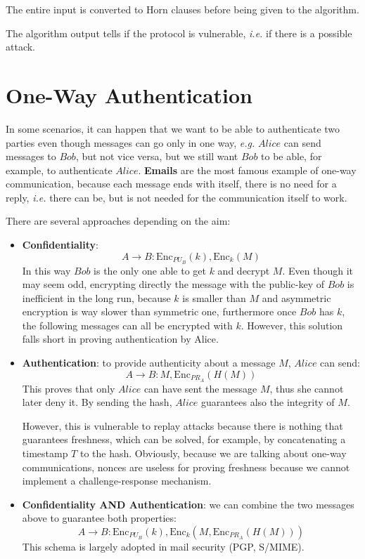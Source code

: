 \documentclass[oneside]{academica}
\begin{document}
The entire input is converted to Horn clauses before being given to the algorithm.

The algorithm output tells if the protocol is vulnerable, \textit{i.e.} if there is a possible attack.

\section{One-Way Authentication}

In some scenarios, it can happen that we want to be able to authenticate two parties even though messages can go only in one way, \textit{e.g.} $Alice$ can send messages to $Bob$, but not vice versa, but we still want $Bob$ to be able, for example, to authenticate $Alice$.
\textbf{Emails} are the most famous example of one-way communication, because each message ends with itself, there is no need for a reply, \textit{i.e.} there can be, but is not needed for the communication itself to work.


\newpage

There are several approaches depending on the aim:
\begin{itemize}
  \item \textbf{Confidentiality}:
    \begin{equation*}
      A \rightarrow B: \text{Enc}_{PU_B}(k), \text{Enc}_k(M)
    \end{equation*}
    In this way $Bob$ is the only one able to get $k$ and decrypt $M$.
    Even though it may seem odd, encrypting directly the message with the public-key of $Bob$ is inefficient in the long run, because $k$ is smaller than $M$ and asymmetric encryption is way slower than symmetric one, furthermore once $Bob$ has $k$, the following messages can all be encrypted with $k$.
    However, this solution falls short in proving authentication by Alice.
  \item \textbf{Authentication}: to provide authenticity about a message $M$, $Alice$ can send:
    \begin{equation*}
      A \rightarrow B: M, \text{Enc}_{PR_A}(H(M))
    \end{equation*}
    This proves that only $Alice$ can have sent the message $M$, thus she cannot later deny it.
    By sending the hash, $Alice$ guarantees also the integrity of $M$.

    However, this is vulnerable to replay attacks because there is nothing that guarantees freshness, which can be solved, for example, by concatenating a timestamp $T$ to the hash.
    Obviously, because we are talking about one-way communications, nonces are useless for proving freshness because we cannot implement a challenge-response mechanism.
  \item \textbf{Confidentiality AND Authentication}: we can combine the two messages above to guarantee both properties:
    \begin{equation*}
      A \rightarrow B: \text{Enc}_{PU_B}(k), \text{Enc}_k(M, \text{Enc}_{PR_A}(H(M)))
    \end{equation*}
    This schema is largely adopted in mail security (PGP, S/MIME).
\end{itemize}
\end{document}
